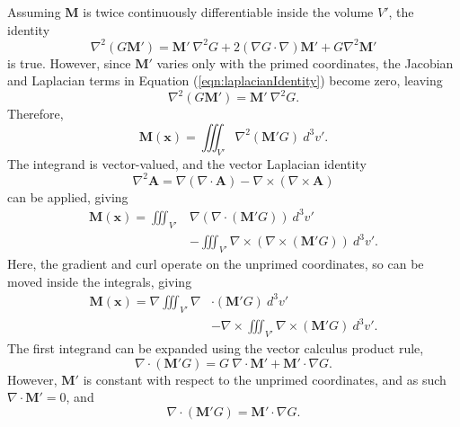 Assuming \(\mathbf{M}\) is twice continuously differentiable inside the volume \(V'\), the identity
\begin{equation}\label{eqn:laplacianIdentity}
    \nabla^2 \left(G\mathbf{M}'\right) = \mathbf{M}'\ \nabla^2 G + 2\left(\nabla G \cdot \nabla\right)\mathbf{M}' + G \nabla^2 \mathbf{M}'
\end{equation}
is true. However, since \(\mathbf{M}'\) varies only with the primed coordinates, the Jacobian and Laplacian terms in Equation (\ref{eqn:laplacianIdentity}) become zero, leaving
\begin{equation}
    \nabla^2 \left(G\mathbf{M}'\right) = \mathbf{M}'\ \nabla^2G \text{.}
\end{equation}
Therefore,
\begin{equation}
    \mathbf{M}\left(\mathbf{x}\right) = \iiint_{V'} \nabla^2 \left(\mathbf{M}' G\right)\ d^3v' \text{.}
\end{equation}
The integrand is vector-valued, and the vector Laplacian identity
\begin{equation}
    \nabla^2 \mathbf{A} = \nabla \left( \nabla \cdot \mathbf{A}\right) - \nabla \times \left( \nabla \times \mathbf{A} \right)
\end{equation}
can be applied, giving
\begin{align}
    \mathbf{M}\left(\mathbf{x}\right) = \iiint_{V'} & \nabla \left( \nabla \cdot \left(\mathbf{M}' G \right) \right)\ d^3v' \nonumber \\
    & - \iiint_{V'} \nabla \times \left( \nabla \times \left(\mathbf{M}' G\right) \right)\ d^3v' \text{.}
\end{align}
Here, the gradient and curl operate on the unprimed coordinates, so can be moved inside the integrals, giving
\begin{align}
    \mathbf{M}\left(\mathbf{x}\right) = \nabla \iiint_{V'} \nabla & \cdot \left(\mathbf{M}' G \right) \ d^3v' \nonumber \\
    & - \nabla \times \iiint_{V'} \nabla \times \left( \mathbf{M}' G\right)\ d^3v' \text{.}
\end{align}
The first integrand can be expanded using the vector calculus product rule,
\begin{equation}
    \nabla \cdot \left( \mathbf{M}' G\right) = G\ \nabla \cdot \mathbf{M}' + \mathbf{M}' \cdot \nabla G \text{.}
\end{equation}
However, \(\mathbf{M}'\) is constant with respect to the unprimed coordinates, and as such \(\nabla \cdot \mathbf{M}' = 0\), and
\begin{equation}
    \nabla \cdot \left( \mathbf{M}' G\right) = \mathbf{M}' \cdot \nabla G \text{.}
\end{equation}
